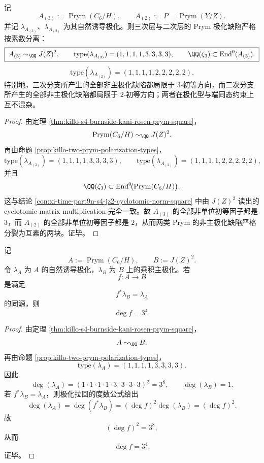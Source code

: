 \begin{conclusion}\label{con:xi-time-part9n-prym-prime-separated-rigidity}
记
\[
A_{(3)}:=\operatorname{Prym}(C_6/H),
\qquad
A_{(2)}:=P=\operatorname{Prym}(Y/Z).
\]
并记 \(\lambda_{A_{(3)}}\)、\(\lambda_{A_{(2)}}\) 为其自然诱导极化。则三次层与二次层的 Prym 极化缺陷严格按素数分离：
\[
\boxed{\;
A_{(3)}\sim_{\QQ}J(Z)^2,\qquad
\mathrm{type}(\lambda_{A_{(3)}})=(1,1,1,1,3,3,3,3),\qquad
\QQ(\zeta_3)\subset \operatorname{End}^0(A_{(3)}).\;}
\]
\[
\boxed{\;
\mathrm{type}(\lambda_{A_{(2)}})=(1,1,1,1,2,2,2,2,2).\;}
\]
特别地，三次分支所产生的全部非主极化缺陷都局限于 \(3\)-初等方向，而二次分支所产生的全部非主极化缺陷都局限于 \(2\)-初等方向；两者在极化型与端同态约束上互不混杂。
\end{conclusion}
\begin{proof}
由定理 \ref{thm:killo-s4-burnside-kani-rosen-prym-square}，
\[
\operatorname{Prym}(C_6/H)\sim_{\QQ}J(Z)^2.
\]
再由命题 \ref{prop:killo-two-prym-polarization-types}，
\[
\mathrm{type}(\lambda_{A_{(3)}})=(1,1,1,1,3,3,3,3),
\qquad
\mathrm{type}(\lambda_{A_{(2)}})=(1,1,1,1,2,2,2,2,2),
\]
并且
\[
\QQ(\zeta_3)\subset \operatorname{End}^0\!\bigl(\operatorname{Prym}(C_6/H)\bigr).
\]
这与结论 \ref{con:xi-time-part9n-s4-jz2-cyclotomic-norm-square} 中由 \(J(Z)^2\) 读出的 cyclotomic matrix multiplication 完全一致。故 \(A_{(3)}\) 的全部非单位初等因子都是 \(3\)，而 \(A_{(2)}\) 的全部非单位初等因子都是 \(2\)，从而两类 Prym 的非主极化缺陷严格分裂为互素的两块。证毕。
\end{proof}

\begin{theorem}\label{thm:xi-time-part9n1a-prym-c6h-jz2-polarized-isogeny-degree}
记
\[
A:=\operatorname{Prym}(C_6/H),
\qquad
B:=J(Z)^2.
\]
令 \(\lambda_A\) 为 \(A\) 的自然诱导极化，\(\lambda_B\) 为 \(B\) 上的乘积主极化。若
\[
f:A\to B
\]
是满足
\[
f^*\lambda_B=\lambda_A
\]
的同源，则
\[
\deg f=3^4.
\]
\end{theorem}
\begin{proof}
由定理 \ref{thm:killo-s4-burnside-kani-rosen-prym-square}，
\[
A\sim_{\QQ}B.
\]
再由命题 \ref{prop:killo-two-prym-polarization-types}，
\[
\mathrm{type}(\lambda_A)=(1,1,1,1,3,3,3,3).
\]
因此
\[
\deg(\lambda_A)
=
(1\cdot1\cdot1\cdot1\cdot3\cdot3\cdot3\cdot3)^2
=
3^8,
\qquad
\deg(\lambda_B)=1.
\]
若 \(f^*\lambda_B=\lambda_A\)，则极化拉回的度数公式给出
\[
\deg(\lambda_A)
=
\deg(f^*\lambda_B)
=
(\deg f)^2\deg(\lambda_B)
=
(\deg f)^2.
\]
故
\[
(\deg f)^2=3^8,
\]
从而
\[
\deg f=3^4.
\]
证毕。
\end{proof}

